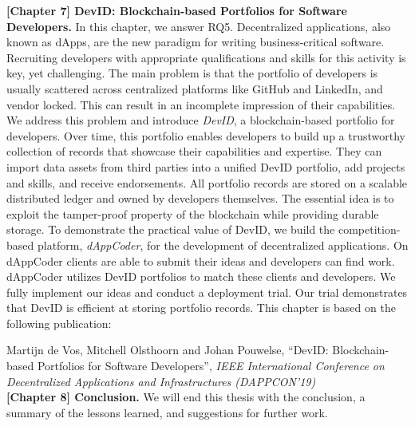 \textbf{[Chapter 7] DevID: Blockchain-based Portfolios for Software Developers.}
In this chapter, we answer RQ5.
Decentralized applications, also known as dApps, are the new paradigm for writing business-critical software.
Recruiting developers with appropriate qualifications and skills for this activity is key, yet challenging.
The main problem is that the portfolio of developers is usually scattered across centralized platforms like GitHub and LinkedIn, and vendor locked.
This can result in an incomplete impression of their capabilities.
We address this problem and introduce \emph{DevID}, a blockchain-based portfolio for developers.
Over time, this portfolio enables developers to build up a trustworthy collection of records that showcase their capabilities and expertise.
They can import data assets from third parties into a unified DevID portfolio, add projects and skills, and receive endorsements.
All portfolio records are stored on a scalable distributed ledger and owned by developers themselves.
The essential idea is to exploit the tamper-proof property of the blockchain while providing durable storage.
To demonstrate the practical value of DevID, we build the competition-based platform, \emph{dAppCoder}, for the development of decentralized applications.
On dAppCoder clients are able to submit their ideas and developers can find work.
dAppCoder utilizes DevID portfolios to match these clients and developers.
We fully implement our ideas and conduct a deployment trial.
Our trial demonstrates that DevID is efficient at storing portfolio records.
This chapter is based on the following publication:

Martijn de Vos, Mitchell Olsthoorn and Johan Pouwelse, \enquote{DevID: Blockchain-based Portfolios for Software Developers}, \emph{IEEE International Conference on Decentralized Applications and Infrastructures (DAPPCON'19)}\\

\textbf{[Chapter 8] Conclusion.} We will end this thesis with the conclusion, a summary of the lessons learned, and suggestions for further work.


%
%